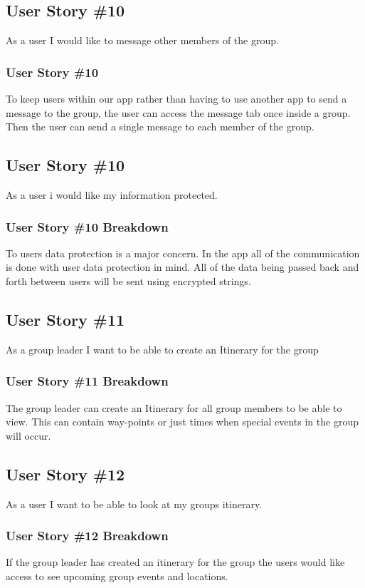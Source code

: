 \subsection{User Story \#10}
As a user I would like to message other members of the group.
\subsubsection{User Story \#10}
To keep users within our app rather than having to use another app to send a message to the group, the user can access the message tab once inside a group.  Then the user can send a single message to each member of the group.

\subsection{User Story \#10} 
As a user i would like my information protected.
\subsubsection{User Story \#10 Breakdown}
To users data protection is a major concern.  In the app all of the communication is done with user data protection in mind.  All of the data being passed back and forth between users will be sent using encrypted strings. 

\subsection{User Story \#11} 
As a group leader I want to be able to create an Itinerary for the group
\subsubsection{User Story \#11 Breakdown}
The group leader can create an Itinerary for all group members to be able to view.  This can contain way-points or just times when special events in the group will occur.

\subsection{User Story \#12}
As a user I want to be able to look at my groups itinerary.
\subsubsection{User Story \#12 Breakdown}
If the group leader has created an itinerary for the group the users would like access to see upcoming group events and locations.

